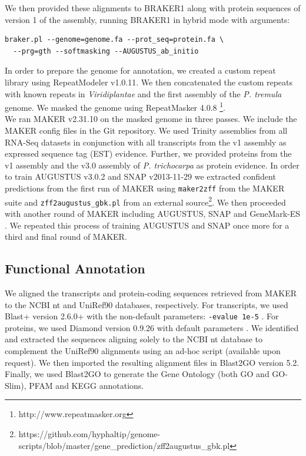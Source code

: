 \documentclass{article}
\begin{document}
We then provided these alignments to BRAKER1 \citep{hoff2015braker1} along with protein sequences of version 1 of the assembly, running BRAKER1 in hybrid mode with arguments:\\

\begin{verbatim}
braker.pl --genome=genome.fa --prot_seq=protein.fa \
  --prg=gth --softmasking --AUGUSTUS_ab_initio
\end{verbatim}

In order to prepare the genome for annotation, we created a custom repeat library using RepeatModeler v1.0.11. We then concatenated the custom repeats with known repeats in {\it Viridiplantae} and the first assembly of the {\it P. tremula} genome. We masked the genome using RepeatMasker 4.0.8 \footnote{http://www.repeatmasker.org}.\\

We ran MAKER v2.31.10 \citep{campbell2014genome} on the masked genome in three passes. We include the MAKER config files in the Git repository. We used Trinity assemblies from all RNA-Seq datasets in conjunction with all transcripts from the v1 assembly as expressed sequence tag (EST) evidence. Further, we provided proteins from the v1 assembly and the v3.0 assembly of {\it P. trichocarpa} \citep{tuskan2006genome} as protein evidence. In order to train AUGUSTUS v3.0.2 \citep{stanke2008using} and SNAP v2013-11-29 \citep{korf2004gene} we extracted confident predictions from the first run of MAKER using \verb|maker2zff| from the MAKER suite and \verb|zff2augustus_gbk.pl| from an external source\footnote{https://github.com/hyphaltip/genome-scripts/blob/master/gene\_prediction/zff2augustus\_gbk.pl}. We then proceeded with another round of MAKER including AUGUSTUS, SNAP and GeneMark-ES \citep{lomsadze2005gene}. We repeated this process of training AUGUSTUS and SNAP once more for a third and final round of MAKER.

\subsection{Functional Annotation}
We aligned the transcripts and protein-coding sequences retrieved from MAKER to the NCBI nt \citep{wheeler2006database} and UniRef90 \citep{uniprot2018uniprot} databases, respectively. For transcripts, we used Blast+ version 2.6.0+ with the non-default parameters: \verb|-evalue 1e-5| \citep{altschul1990basic}. For proteins, we used Diamond version 0.9.26 with default parameters \citep{buchfink2015fast}. We identified and extracted the sequences aligning solely to the NCBI nt database to complement the UniRef90 alignments using an ad-hoc script (available upon request). We then imported the resulting alignment files in Blast2GO \citep{gotz2008high} version 5.2. Finally, we used Blast2GO to generate the Gene Ontology (both GO and GO-Slim), PFAM \citep{el2018pfam} and KEGG \citep{kanehisa2000kegg} annotations. 
\end{document}
